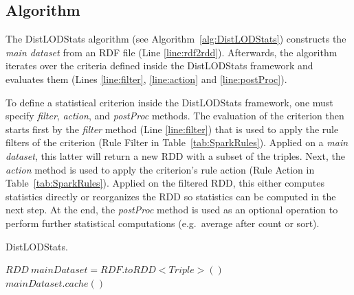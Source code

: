 \subsection{Algorithm}
\label{sec:Algorithm}

The DistLODStats algorithm (see Algorithm~\ref{alg:DistLODStats}) constructs the \emph{main dataset} from an RDF file (Line \ref{line:rdf2rdd}).
Afterwards, the algorithm iterates over the criteria defined inside the DistLODStats framework and evaluates them (Lines \ref{line:filter}, \ref{line:action} and \ref{line:postProc}).

To define a statistical criterion inside the DistLODStats framework, one must specify \emph{filter}, \emph{action}, and \emph{postProc} methods. 
The evaluation of the criterion then starts first by the \emph{filter} method (Line \ref{line:filter}) that is used to apply the rule filters of the criterion (Rule Filter in Table~\ref{tab:SparkRules}). 
Applied on a \emph{main dataset}, this latter will return a new RDD with a subset of the triples.
Next, the \emph{action} method is used to apply the criterion's rule action (Rule Action in Table~\ref{tab:SparkRules}).
Applied on the filtered RDD, this either computes statistics directly or reorganizes the RDD so statistics can be computed in the next step.
At the end, the \emph{postProc} method is used as an optional operation to perform further statistical computations (e.g.~average after count or sort).

\begin{algorithm}
\caption{DistLODStats.}
\label{alg:DistLODStats}
    $RDD~\textit{mainDataset} = RDF.toRDD<Triple>()$ \label{line:rdf2rdd} \\
    $\textit{mainDataset}.cache() $ \label{line:cache}\\
\end{algorithm}

